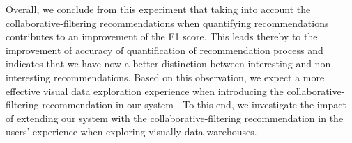 Overall, we conclude from this experiment that taking into account the collaborative-filtering recommendations when quantifying recommendations contributes to an improvement of the F1 score. This leads thereby to the improvement of accuracy of quantification of recommendation process and indicates that we have now a better distinction between interesting and non-interesting recommendations. 
 Based on this observation, we expect a more effective visual data exploration experience when introducing the collaborative-filtering recommendation in our system \prototype{}. To this end, we investigate the impact of  extending our system \prototype{} with the collaborative-filtering recommendation in the users' experience when exploring visually data warehouses.










